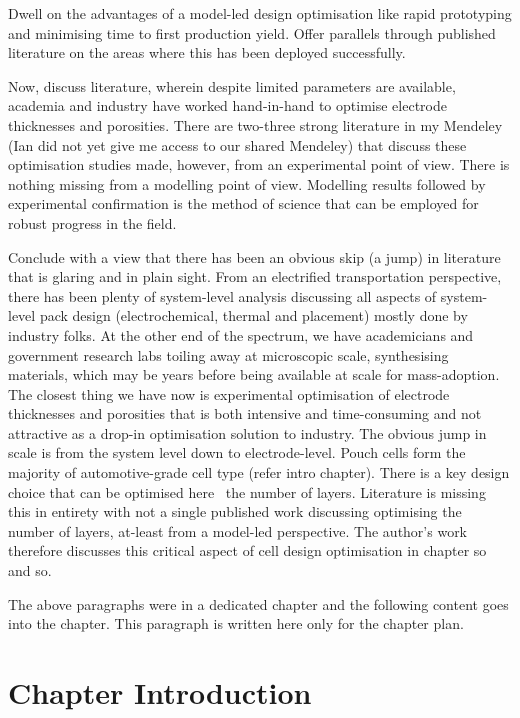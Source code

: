 Dwell  on  the  advantages  of   a  model-led  design  optimisation  like  rapid
prototyping  and minimising  time  to first  production  yield. Offer  parallels
through  published  literature  on  the  areas  where  this  has  been  deployed
successfully.

Now,  discuss  literature, wherein  despite  limited  parameters are  available,
academia and industry have worked hand-in-hand to optimise electrode thicknesses
and  porosities. There  are  two-three  strong literature  in  my Mendeley  (Ian
did  not  yet  give  me  access  to our  shared  Mendeley)  that  discuss  these
optimisation studies made, however, from an experimental point of view. There is
nothing missing  from a modelling point  of view. Modelling results  followed by
experimental confirmation  is the  method of  science that  can be  employed for
robust progress in the field.

Conclude with a view that there has  been an obvious skip (a jump) in literature
that  is  glaring  and  in  plain  sight.  From  an  electrified  transportation
perspective,  there has  been  plenty of  system-level  analysis discussing  all
aspects  of system-level  pack design  (electrochemical, thermal  and placement)
mostly  done by  industry folks.  At  the other  end  of the  spectrum, we  have
academicians and  government research  labs toiling  away at  microscopic scale,
synthesising materials, which  may be years before being available  at scale for
mass-adoption. The  closest thing  we have now  is experimental  optimisation of
electrode thicknesses and  porosities that is both  intensive and time-consuming
and not attractive  as a drop-in optimisation solution to  industry. The obvious
jump in scale is from the system level down to electrode-level. Pouch cells form
the majority of automotive-grade cell type (refer intro chapter). There is a key
design choice that can be optimised here \viz~the number of layers. Literature
is  missing  this in  entirety  with  not  a  single published  work  discussing
optimising  the  number  of  layers,  at-least  from  a  model-led  perspective.
The  author's work  therefore  discusses  this critical  aspect  of cell  design
optimisation in chapter so and so.


The above paragraphs were in a  dedicated chapter and the following content goes
into the chapter. This paragraph is written here only for the chapter plan.

\section{Chapter Introduction}


